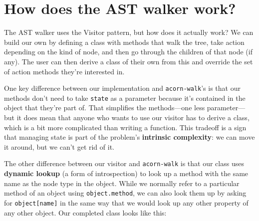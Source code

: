 \documentclass[krantzl]{krantz}
\newcommand{\glossref}[1]{\textbf{#1}}
\begin{document}
\section{How does the AST walker work?}\label{style-checker-walker}


The AST walker uses the Visitor pattern,
but how does it actually work?
We can build our own by defining a class with methods that walk the tree,
take action depending on the kind of node,
and then go through the children of that node (if any).
The user can then derive a class of their own from this
and override the set of action methods they're interested in.


One key difference between our implementation and \texttt{acorn-walk}'s is that
our methods don't need to take \texttt{state} as a parameter
because it's contained in the object that they're part of.
That simplifies the methods---one less parameter---but it does mean that
anyone who wants to use our visitor has to derive a class,
which is a bit more complicated than writing a function.
This tradeoff is a sign that managing state is part of the problem's
\glossref{intrinsic complexity}:
we can move it around,
but we can't get rid of it.


The other difference between our visitor and \texttt{acorn-walk} is that
our class uses \glossref{dynamic lookup}
(a form of introspection)
to look up a method
with the same name as the node type in the object.
While we normally refer to a particular method of an object using \texttt{object.method},
we can also look them up by asking for \texttt{object[name]}
in the same way that we would look up any other property of any other object.
Our completed class looks like this:
\end{document}
